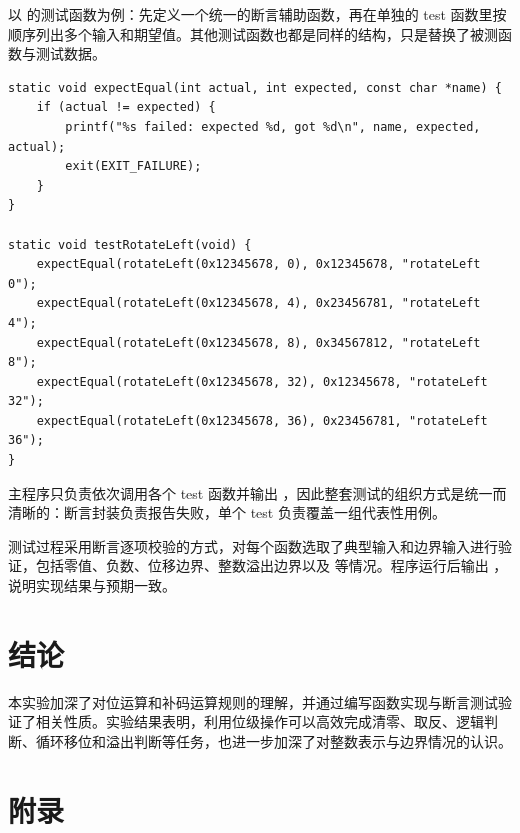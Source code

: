 \documentclass[12pt, a4paper]{academics}
\begin{document}
以  的测试函数为例：先定义一个统一的断言辅助函数，再在单独的 test 函数里按顺序列出多个输入和期望值。其他测试函数也都是同样的结构，只是替换了被测函数与测试数据。

\begin{verbatim}
static void expectEqual(int actual, int expected, const char *name) {
    if (actual != expected) {
        printf("%s failed: expected %d, got %d\n", name, expected, actual);
        exit(EXIT_FAILURE);
    }
}

static void testRotateLeft(void) {
    expectEqual(rotateLeft(0x12345678, 0), 0x12345678, "rotateLeft 0");
    expectEqual(rotateLeft(0x12345678, 4), 0x23456781, "rotateLeft 4");
    expectEqual(rotateLeft(0x12345678, 8), 0x34567812, "rotateLeft 8");
    expectEqual(rotateLeft(0x12345678, 32), 0x12345678, "rotateLeft 32");
    expectEqual(rotateLeft(0x12345678, 36), 0x23456781, "rotateLeft 36");
}
\end{verbatim}

主程序只负责依次调用各个 test 函数并输出 ，因此整套测试的组织方式是统一而清晰的：断言封装负责报告失败，单个 test 负责覆盖一组代表性用例。

测试过程采用断言逐项校验的方式，对每个函数选取了典型输入和边界输入进行验证，包括零值、负数、位移边界、整数溢出边界以及  等情况。程序运行后输出 ，说明实现结果与预期一致。

\section{结论}

本实验加深了对位运算和补码运算规则的理解，并通过编写函数实现与断言测试验证了相关性质。实验结果表明，利用位级操作可以高效完成清零、取反、逻辑判断、循环移位和溢出判断等任务，也进一步加深了对整数表示与边界情况的认识。

\appendix
\section{附录}

\subsection{}
\inputminted{c}{../src/functions.c}

\subsection{}
\inputminted{c}{../src/test_functions.c}
\end{document}
